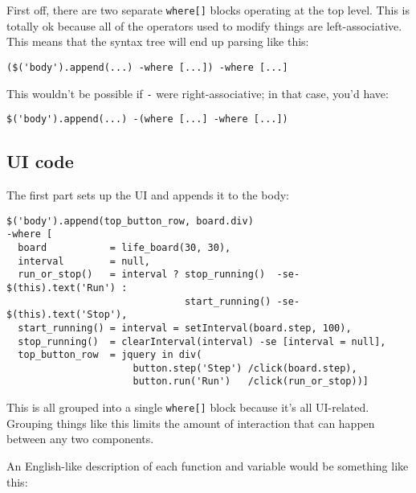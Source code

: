 \documentclass{report}
\begin{document}
    First off, there are two separate {\tt where[]} blocks operating at the top level. This is totally ok because all of the operators used to modify things are left-associative. This means
    that the syntax tree will end up parsing like this:

\begin{verbatim}
($('body').append(...) -where [...]) -where [...]
\end{verbatim}

    This wouldn't be possible if {\tt -} were right-associative; in that case, you'd have:

\begin{verbatim}
$('body').append(...) -(where [...] -where [...])
\end{verbatim}

\subsection{UI code}
      The first part sets up the UI and appends it to the body:

\begin{verbatim}
$('body').append(top_button_row, board.div)
-where [
  board           = life_board(30, 30),
  interval        = null,
  run_or_stop()   = interval ? stop_running()  -se- $(this).text('Run') :
                               start_running() -se- $(this).text('Stop'),
  start_running() = interval = setInterval(board.step, 100),
  stop_running()  = clearInterval(interval) -se [interval = null],
  top_button_row  = jquery in div(
                      button.step('Step') /click(board.step),
                      button.run('Run')   /click(run_or_stop))]
\end{verbatim}

      This is all grouped into a single {\tt where[]} block because it's all UI-related. Grouping things like this limits the amount of interaction that can happen between any two components.

      An English-like description of each function and variable would be something like this:
\end{document}
